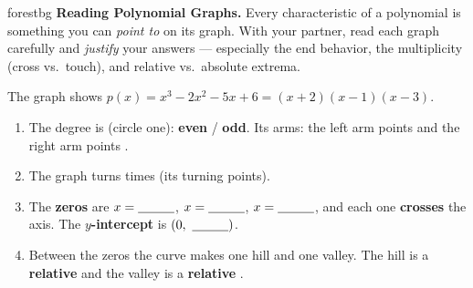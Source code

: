 \documentclass[10pt]{article}
\newcommand{\lgrid}[4]{%
  \draw[step=1, linegray!40, very thin] (#1,#3) grid (#2,#4);
  \draw[->, semithick, charcoal] (#1,0)--(#2,0) node[below right, font=\scriptsize]{$x$};
  \draw[->, semithick, charcoal] (0,#3)--(0,#4) node[left, font=\scriptsize]{$y$};}
\begin{document}
\namepartnerperiod

\vspace{0.08in}

\begin{headlinebox}{forestbg}
\small\textbf{Reading Polynomial Graphs.} Every characteristic of a polynomial is something you can
\emph{point to} on its graph. With your partner, read each graph carefully and \emph{justify} your
answers --- especially the end behavior, the multiplicity (cross vs.\ touch), and relative vs.\
absolute extrema.
\end{headlinebox}

\vspace{0.06in}

\begin{tcolorbox}[colback=white, colframe=black!40, title=\textbf{Tier R --- Remediate},
    fonttitle=\bfseries, arc=1.5mm, left=3mm, right=3mm, top=2mm, bottom=2mm, breakable]
The graph shows $p(x) = x^3 - 2x^2 - 5x + 6 = (x+2)(x-1)(x-3)$.
\begin{center}
\end{center}
\begin{enumerate}[leftmargin=1.7em, itemsep=7pt]
  \item The degree is (circle one): \textbf{even} \; / \; \textbf{odd}. \quad Its arms: the left arm
        points \blank{1.4cm} and the right arm points \blank{1.4cm}.
  \item The graph turns \blank{1.0cm} times (its turning points).
  \item The \textbf{zeros} are $x=\blank{1.0cm}$, \; $x=\blank{1.0cm}$, \; $x=\blank{1.0cm}$, and each
        one \textbf{crosses} the axis. The \textbf{$y$-intercept} is $(0,\ \blank{1.0cm})$.
  \item Between the zeros the curve makes one hill and one valley. The hill is a
        \textbf{relative \blank{2.0cm}} and the valley is a \textbf{relative \blank{2.0cm}}.
\end{enumerate}
\end{tcolorbox}
\end{document}
